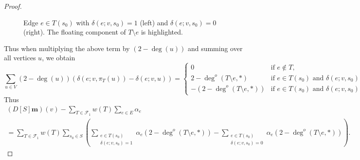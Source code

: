 \documentclass{amsart}
\theoremstyle{definition}
\newcommand{\boldm}{\mathbf{m}}
\newcommand{\trees}{\mathcal{F}_1}
\newcommand{\degout}{\deg^o}
\begin{document}
\begin{proof}
\begin{figure}[h]
\qquad\qquad
\caption{Edge $e \in T(s_0)$ with $\delta(e; v, s_0 ) = 1$ (left) and $\delta(e; v, s_0) = 0$ (right). The floating component of $T \setminus e$ is highlighted.}
\end{figure}

Thus when multiplying the above term by $(2 - \deg(u))$ and summing over all vertices $u$, we obtain
\[
	\sum_{u \in V} (2 - \deg(u)) (\delta(e; v, \pi_T(u)) - \delta(e; v, u)) = \begin{cases}
	0 &\text{if } e \not \in T, \\
	2 - \degout(T \setminus e, *) &\text{if } e \in T(s_0) \text{ and } \delta(e; v, s_0) = 1, \\
	-(2 - \degout(T \setminus e, *)) &\text{if } e \in T(s_0) \text{ and } \delta(e; v, s_0) = 0 .
	\end{cases}
\]
Thus
\begin{multline}\label{eq:1}
	(D[S] \boldm)(v) - \sum_{T \in \trees} w(T) \sum_{e \in E} \alpha_e \\
	= \sum_{T\in \trees} w(T) \sum_{s_0 \in S} \left( \sum_{\substack{e \in T(s_0) \\ \delta(e;v,s_0) = 1}} \alpha_e ( 2 - \deg^o(T\setminus e,*)) 
	- \sum_{\substack{e  \in T(s_0) \\ \delta(e;v,s_0) = 0}} \alpha_e (2 - \deg^o(T\setminus e,*) ) \right).
\end{multline}


\end{proof}
\end{document}
